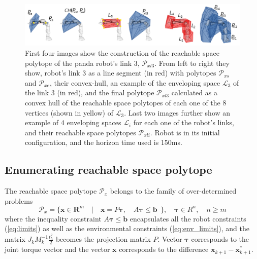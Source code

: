 
\begin{figure}[!t]
    \centering
    \includegraphics[width=\linewidth]{Papers/images/minkowski3.png}
    \caption{ First four images show the construction of the reachable space polytope of the panda robot's link 3, $\mathcal{P}_{xl3}$. From left to right they show, robot's link 3 as a line segment (in red) with polytopes $\mathcal{P}_{xs}$ and $\mathcal{P}_{xe}$, their convex-hull, an example of the enveloping space $\mathcal{L}_3$ of the link 3 (in red), and the final polytope $\mathcal{P}_{xl3}$ calculated as a convex hull of the reachable space polytopes of each one of the 8 vertices (shown in yellow) of $\mathcal{L}_3$.
    Last two images further show an example of 4 enveloping spaces $\mathcal{L}_i$ for each one of the robot's links, and their reachable space polytopes $\mathcal{P}_{xli}$. Robot is in its initial configuration, and the horizon time used is 150ms.}
    \label{fig:minkowski}

\end{figure}


\subsection{Enumerating reachable space polytope}
\label{ch:enumerating}

The reachable space polytope $\mathcal{P}_x$ belongs to the family of over-determined problems
\begin{equation}
    \mathcal{P}_x = \{ \bm{x} \in \mathbf{R}^m \quad| \quad \bm{x}=P\bm{\tau},\quad  A\bm{\tau}\leq \bm{b} ~~\}, \quad \bm{\tau}\in R^n, \quad n\geq m
\label{eq:polytope_family}
\end{equation}
where the inequality constraint $A\bm{\tau}\leq \bm{b}$ encapsulates all the robot constraints (\ref{eq:limits}) as well as the environmental constraints (\ref{eq:env_limits}), and the matrix $J_k M_k^{-1}\frac{t_h^2}{2}$ becomes the projection matrix $P$. Vector $\bm{\tau}$ corresponds to the joint torque vector and the vector $\bm{x}$ corresponds to the difference $\bm{x}_{k+1}\!-\!\bm{x}_{k+1}^*$.

